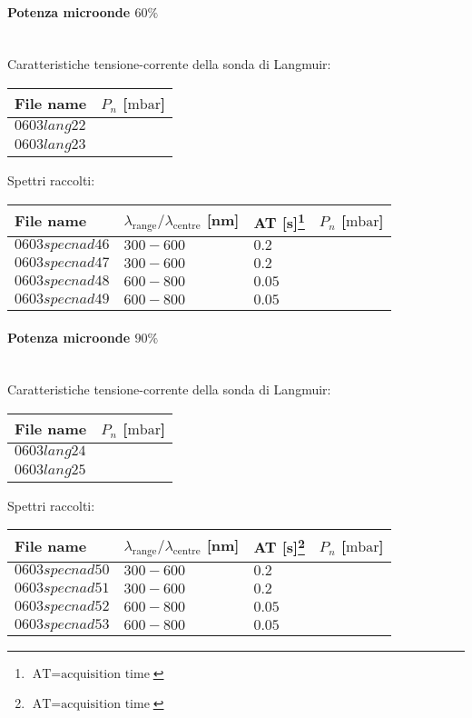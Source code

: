 \paragraph*{Potenza microonde $\text{60\%}$} ~\\
Caratteristiche tensione-corrente della sonda di Langmuir:
\begin{center}
\begin{tabular}{p{3cm}p{3cm}}
\toprule
File name	&$P_n$ [$\si{\milli\bar}$]\\
\midrule
$0603lang22$	&$  $\\
$0603lang23$	&$  $\\
\bottomrule
\end{tabular}
\end{center}

Spettri raccolti:
\begin{center}
\begin{tabular}{p{3cm}p{4cm}p{2cm}p{3cm}}
\toprule
File name	&$\lambda_\text{range}\text{/}\lambda_\text{centre}$ [nm] 	&AT [s]\footnote{$\text{AT}=\text{acquisition time}$} &$P_n$ [$\si{\milli\bar}$]\\
\midrule
$0603specnad46$	&$300-600$	&$0.2$		&$  $\\
$0603specnad47$	&$300-600$	&$0.2$		&$  $\\
$0603specnad48$	&$600-800$	&$0.05$		&$  $\\
$0603specnad49$	&$600-800$	&$0.05$		&$  $\\

\bottomrule
\end{tabular}
\end{center}

\paragraph*{Potenza microonde $\text{90\%}$} ~\\
Caratteristiche tensione-corrente della sonda di Langmuir:
\begin{center}
\begin{tabular}{p{3cm}p{3cm}}
\toprule
File name	&$P_n$ [$\si{\milli\bar}$]\\
\midrule
$0603lang24$	&$  $\\
$0603lang25$	&$  $\\
\bottomrule
\end{tabular}
\end{center}

Spettri raccolti:
\begin{center}
\begin{tabular}{p{3cm}p{4cm}p{2cm}p{3cm}}
\toprule
File name	&$\lambda_\text{range}\text{/}\lambda_\text{centre}$ [nm] 	&AT [s]\footnote{$\text{AT}=\text{acquisition time}$} &$P_n$ [$\si{\milli\bar}$]\\
\midrule
$0603specnad50$	&$300-600$	&$0.2$		&$  $\\
$0603specnad51$	&$300-600$	&$0.2$		&$  $\\
$0603specnad52$	&$600-800$	&$0.05$		&$  $\\
$0603specnad53$	&$600-800$	&$0.05$		&$  $\\

\bottomrule
\end{tabular}
\end{center}